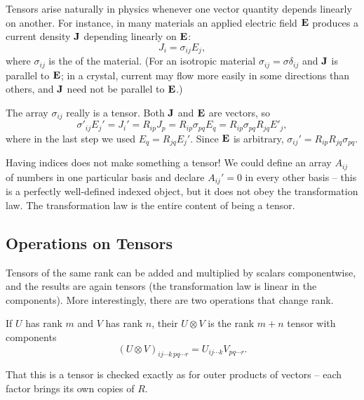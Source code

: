 \documentclass[a4paper]{scrartcl}
\begin{document}
\begin{example}
	Tensors arise naturally in physics whenever one vector quantity depends linearly on another. For instance, in many materials an applied electric field $\mathbf{E}$ produces a current density $\mathbf{J}$ depending linearly on $\mathbf{E}$:
	$$
	J_i = \sigma_{ij} E_j,
	$$
	where $\sigma_{ij}$ is the  of the material. (For an isotropic material $\sigma_{ij} = \sigma \delta_{ij}$ and $\mathbf{J}$ is parallel to $\mathbf{E}$; in a crystal, current may flow more easily in some directions than others, and $\mathbf{J}$ need not be parallel to $\mathbf{E}$.)

	The array $\sigma_{ij}$ really is a tensor. Both $\mathbf{J}$ and $\mathbf{E}$ are vectors, so
	$$
	\sigma'_{ij}E_j' = J_i' = R_{ip} J_p = R_{ip} \sigma_{pq} E_q = R_{ip}\sigma_{pq} R_{jq} E'_j,
	$$
	where in the last step we used $E_q = R_{jq}E_j'$. Since $\mathbf{E}$ is arbitrary, $\sigma_{ij}' = R_{ip}R_{jq}\sigma_{pq}$.
\end{example}

\begin{remark}
	Having indices does not make something a tensor! We could define an array $A_{ij}$ of numbers in one particular basis and declare $A_{ij}' = 0$ in every other basis -- this is a perfectly well-defined indexed object, but it does not obey the transformation law. The transformation law is the entire content of being a tensor.
\end{remark}

\subsection{Operations on Tensors}

Tensors of the same rank can be added and multiplied by scalars componentwise, and the results are again tensors (the transformation law is linear in the components). More interestingly, there are two operations that change rank.

\begin{definition}
	If $U$ has rank $m$ and $V$ has rank $n$, their  $U \otimes V$ is the rank $m + n$ tensor with components
	$$
	(U \otimes V)_{ij\cdots k \, pq \cdots r} = U_{ij \cdots k} V_{pq\cdots r}.
	$$
\end{definition}

That this is a tensor is checked exactly as for outer products of vectors -- each factor brings its own copies of $R$.
\end{document}
